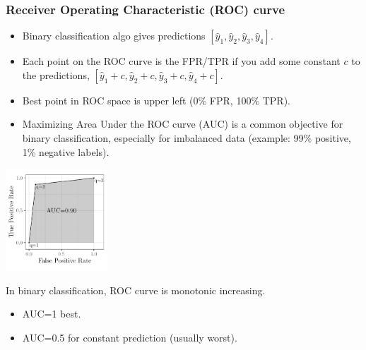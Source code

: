 \documentclass{beamer}
\begin{document}
\begin{frame}
  \frametitle{Receiver Operating Characteristic (ROC) curve}

  \begin{itemize}
  \item Binary classification algo gives predictions
    $[\hat y_1,\hat y_2,\hat y_3,\hat y_4]$.
  \item Each point on the ROC curve is the FPR/TPR if you add some
  constant $c$ to the predictions,
  $[\hat y_1+c,\hat y_2+c,\hat y_3+c,\hat y_4+c]$.
  \item Best point in ROC space is upper left (0\% FPR, 100\% TPR).
  \item Maximizing Area Under the ROC curve (AUC) is a common
    objective for binary classification, especially for imbalanced
    data (example: 99\% positive, 1\% negative labels).
  \end{itemize} 
  
  \parbox{1.5in}{
\includegraphics[width=1.5in]{figure-more-than-one-less-auc}
}
\parbox{2.5in}{
In binary classification, ROC curve is monotonic increasing.
  \begin{itemize}
  \item AUC=1 best.
  \item AUC=0.5 for constant prediction (usually worst).
  \end{itemize}
}

\end{frame}
\end{document}
